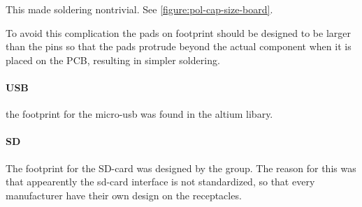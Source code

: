 This made soldering nontrivial.
See \vref{figure:pol-cap-size-board}.

To avoid this complication the pads on footprint should be designed to be larger than the pins so that the pads protrude beyond the actual component when it is placed on the PCB, resulting in simpler soldering.

\paragraph{USB}

the footprint for the micro-usb was found in the altium libary. 


\paragraph{SD}

The footprint for the SD-card was designed by the group. The reason for this was that appearently the sd-card interface is not standardized, so that 
every manufacturer have their own design on the receptacles. 






